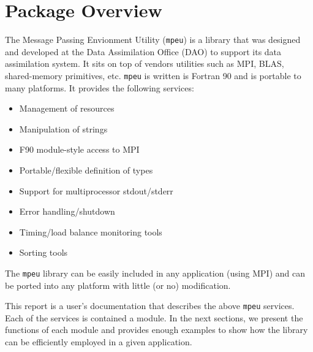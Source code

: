 %  
%  
%  
\section{Package Overview }
%
% 
\setcounter{secnumdepth}{5}
\setlength{\parskip}{0.5em}
%
The Message Passing Envionment Utility ({\tt mpeu}) is a library that
was designed and developed at the Data Assimilation Office (DAO) to
support its data assimilation system.
It sits on top of vendors utilities such as MPI, BLAS, shared-memory
primitives, etc. 
%
{\tt mpeu} is written is Fortran 90 and is portable to many platforms.
It provides the following services:
%
\begin{itemize}
\item Management of resources
\item Manipulation of strings
\item F90 module-style access to MPI
\item Portable/flexible definition of types
\item Support for multiprocessor stdout/stderr
\item Error handling/shutdown
\item Timing/load balance monitoring tools
\item Sorting tools
\end{itemize}
%

The {\tt mpeu} library can be easily included in any application (using
MPI) and can be ported into any platform with little (or no) modification.

This report is a user's documentation that describes the above {\tt mpeu}
services.
Each of the services is contained a module. 
In the next sections, we present the functions of each module and provides 
enough examples to show how the library can be efficiently employed in a 
given application.
